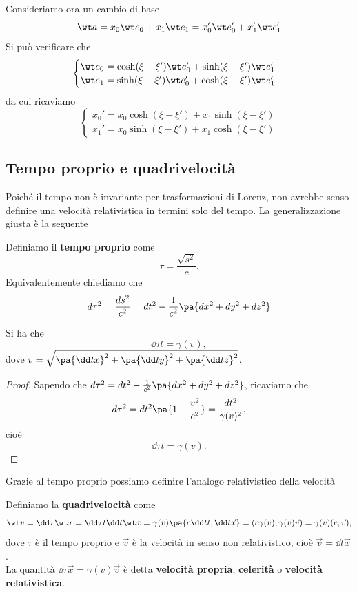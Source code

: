 \noindent
Consideriamo ora un cambio di base
\[\wt a=x_0\wt e_0+x_1\wt e_1=x_0'\wt e_0'+x_1'\wt e_1'\]
Si pu\`o verificare che
\[\begin{cases}
\wt e_0=\cosh(\xi-\xi')\wt e_0'+\sinh(\xi-\xi')\wt e_1'\\
\wt e_1=\sinh(\xi-\xi')\wt e_0'+\cosh(\xi-\xi')\wt e_1'
\end{cases}\]
da cui ricaviamo
\[\begin{cases}
x_0'=x_0\cosh(\xi-\xi')+x_1\sinh(\xi-\xi')\\
x_1'=x_0\sinh(\xi-\xi')+x_1\cosh(\xi-\xi')
\end{cases}\]

\subsection{Tempo proprio e quadrivelocit\`a}
Poich\'e il tempo non \`e invariante per trasformazioni di Lorenz, non avrebbe senso definire una velocit\`a relativistica in termini solo del tempo. La generalizzazione giusta \`e la seguente

\begin{definition}
Definiamo il \textbf{tempo proprio} come
\[\tau=\frac{\sqrt{s^2}}c.\]
Equivalentemente chiediamo che
\[d\tau^2=\frac{ds^2}{c^2}=dt^2-\frac1{c^2}\pa{dx^2+dy^2+dz^2}\]
\end{definition}

\begin{proposition}\label{DerivataTempoPerTempoProprio}
Si ha che
\[\dd \tau t=\gamma(v),\]
dove $v=\sqrt{\pa{\dd tx}^2+\pa{\dd ty}^2+\pa{\dd tz}^2}$.
\end{proposition}
\begin{proof}
Sapendo che $d\tau^2=dt^2-\frac1{c^2}\pa{dx^2+dy^2+dz^2}$, ricaviamo che
\[d\tau^2=dt^2\pa{1-\frac{v^2}{c^2}}=\frac{dt^2}{\gamma(v)^2},\]
cio\`e
\[\dd \tau t=\gamma(v).\]
\end{proof}

\noindent Grazie al tempo proprio possiamo definire l'analogo relativistico della velocit\`a

\begin{definition}[Quadrivelocit\`a]
Definiamo la \textbf{quadrivelocit\`a} come
\[\wt v=\dd \tau{\wt x}=\dd \tau t\dd t{\wt x}=\gamma(v)\pa{c\dd tt,\dd t{\vec x}}=(c\gamma(v),\gamma(v)\vec v)=\gamma(v)(c,\vec v),\]
dove $\tau$ \`e il tempo proprio e $\vec v$ \`e la velocit\`a in senso non relativistico, cio\`e $\vec v=\dd t{\vec x}$.\\
La quantit\`a $\dd \tau{\vec x}=\gamma(v)\vec v$ \`e detta \textbf{velocit\`a propria}, \textbf{celerit\`a} o \textbf{velocit\`a relativistica}.
\end{definition}

